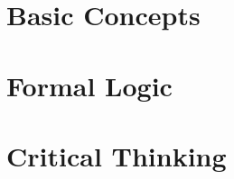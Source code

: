 \documentclass[openany, twoside]{book}
\begin{document}
\raggedright
\setlength{\parindent}{1em}
\setlength{\parskip}{1em}	

\frontmatter
\pagestyle{plain} %

	
{
\setlength{\parskip}{0em}

\renewcommand{\cftpartpresnum}{\sf\Large\partname\ }
\tableofcontents
}






\mainmatter
\setlength{\parindent}{1em}
\pagestyle{headings} %

\part{Basic Concepts} \label{part:basic_concepts}
	


\part{Formal Logic} \label{part:formal_logic}



	







\part{Critical Thinking} \label{part:CT}	









\end{document}
